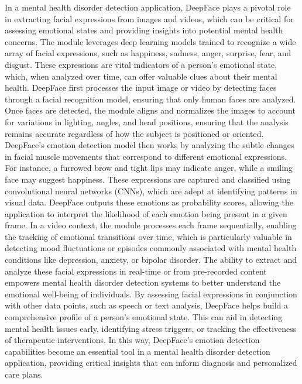 \vspace{1em}

\noindent
In a mental health disorder detection application, DeepFace plays a pivotal role in extracting facial expressions from images and videos, which can be critical for assessing emotional states and providing insights into potential mental health concerns. The module leverages deep learning models trained to recognize a wide array of facial expressions, such as happiness, sadness, anger, surprise, fear, and disgust. These expressions are vital indicators of a person’s emotional state, which, when analyzed over time, can offer valuable clues about their mental health. DeepFace first processes the input image or video by detecting faces through a facial recognition model, ensuring that only human faces are analyzed. Once faces are detected, the module aligns and normalizes the images to account for variations in lighting, angles, and head positions, ensuring that the analysis remains accurate regardless of how the subject is positioned or oriented. DeepFace's emotion detection model then works by analyzing the subtle changes in facial muscle movements that correspond to different emotional expressions. For instance, a furrowed brow and tight lips may indicate anger, while a smiling face may suggest happiness. These expressions are captured and classified using convolutional neural networks (CNNs), which are adept at identifying patterns in visual data. DeepFace outputs these emotions as probability scores, allowing the application to interpret the likelihood of each emotion being present in a given frame. In a video context, the module processes each frame sequentially, enabling the tracking of emotional transitions over time, which is particularly valuable in detecting mood fluctuations or episodes commonly associated with mental health conditions like depression, anxiety, or bipolar disorder. The ability to extract and analyze these facial expressions in real-time or from pre-recorded content empowers mental health disorder detection systems to better understand the emotional well-being of individuals. By assessing facial expressions in conjunction with other data points, such as speech or text analysis, DeepFace helps build a comprehensive profile of a person’s emotional state. This can aid in detecting mental health issues early, identifying stress triggers, or tracking the effectiveness of therapeutic interventions. In this way, DeepFace’s emotion detection capabilities become an essential tool in a mental health disorder detection application, providing critical insights that can inform diagnosis and personalized care plans.




